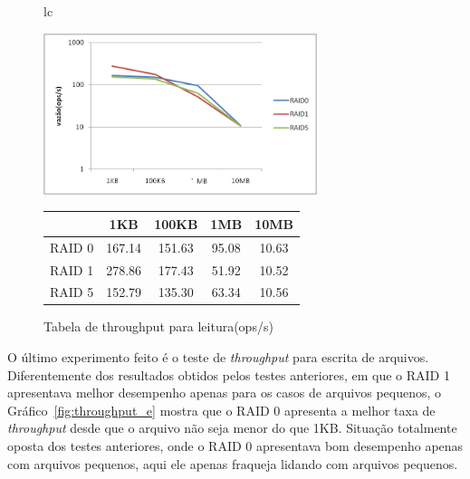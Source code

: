 	\begin{figure}[h]
		\begin{tabular}{lc}
			\begin{minipage}{.50\textwidth}
				\begin{center}
					
					\includegraphics[clip,width=8.0cm]{images/resultados/throughput_leitura.png}
					\caption{Gráfico de throughput para leitura(ops/s)}
					\label{fig:throughput_l}
					
				\end{center}
				
			\end{minipage}
			
			\begin{minipage}{.5\textwidth}
				\makeatletter
				\def\@captype{table}
				\makeatother
				\caption{Tabela de throughput para leitura(ops/s)}
				\label{tab:throughput_l}
				\begin{center}
					\begin{tabular}{|c|c|c|c|c|} \hline
						& 1KB & 100KB & 1MB & 10MB \\ \hline
						
						RAID 0	& 167.14 & 151.63 & 95.08 & 10.63\\ \hline
						RAID 1	& 278.86 & 177.43 & 51.92 & 10.52\\ \hline
						RAID 5	& 152.79 & 135.30 & 63.34 & 10.56\\ \hline
						
					\end{tabular}
				\end{center}
				
			\end{minipage}
		\end{tabular}
	\end{figure}
	
	
	O último experimento feito é o teste de \textit{throughput} para escrita de arquivos. Diferentemente dos resultados obtidos pelos testes anteriores, em que o RAID 1 apresentava melhor desempenho apenas para os casos de arquivos pequenos, o Gráfico~\ref{fig:throughput_e} mostra que o RAID 0 apresenta a melhor taxa de \textit{throughput} desde que o arquivo não seja menor do que 1KB. Situação totalmente oposta dos testes anteriores, onde o RAID 0 apresentava bom desempenho apenas com arquivos pequenos, aqui ele apenas fraqueja lidando com arquivos pequenos. 
	\\
	

